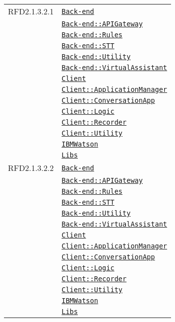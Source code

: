 \begin{longtable}{|>{\centering}m{3cm}|m{10cm}<{\centering}|}
RFD2.1.3.2.1 & \hyperref[Back-end]{\texttt{Back-end}}\\
& \hyperref[Back-end::APIGateway]{\texttt{Back-end::APIGateway}}\\
& \hyperref[Back-end::Rules]{\texttt{Back-end::Rules}}\\
& \hyperref[Back-end::STT]{\texttt{Back-end::STT}}\\
& \hyperref[Back-end::Utility]{\texttt{Back-end::Utility}}\\
& \hyperref[Back-end::VirtualAssistant]{\texttt{Back-end::VirtualAssistant}}\\
& \hyperref[Client]{\texttt{Client}}\\
& \hyperref[Client::ApplicationManager]{\texttt{Client::ApplicationManager}}\\
& \hyperref[Client::ConversationApp]{\texttt{Client::ConversationApp}}\\
& \hyperref[Client::Logic]{\texttt{Client::Logic}}\\
& \hyperref[Client::Recorder]{\texttt{Client::Recorder}}\\
& \hyperref[Client::Utility]{\texttt{Client::Utility}}\\
& \hyperref[IBMWatson]{\texttt{IBMWatson}}\\
& \hyperref[Libs]{\texttt{Libs}}\\ \hline

RFD2.1.3.2.2 & \hyperref[Back-end]{\texttt{Back-end}}\\
& \hyperref[Back-end::APIGateway]{\texttt{Back-end::APIGateway}}\\
& \hyperref[Back-end::Rules]{\texttt{Back-end::Rules}}\\
& \hyperref[Back-end::STT]{\texttt{Back-end::STT}}\\
& \hyperref[Back-end::Utility]{\texttt{Back-end::Utility}}\\
& \hyperref[Back-end::VirtualAssistant]{\texttt{Back-end::VirtualAssistant}}\\
& \hyperref[Client]{\texttt{Client}}\\
& \hyperref[Client::ApplicationManager]{\texttt{Client::ApplicationManager}}\\
& \hyperref[Client::ConversationApp]{\texttt{Client::ConversationApp}}\\
& \hyperref[Client::Logic]{\texttt{Client::Logic}}\\
& \hyperref[Client::Recorder]{\texttt{Client::Recorder}}\\
& \hyperref[Client::Utility]{\texttt{Client::Utility}}\\
& \hyperref[IBMWatson]{\texttt{IBMWatson}}\\
& \hyperref[Libs]{\texttt{Libs}}\\ \hline


\end{longtable}
